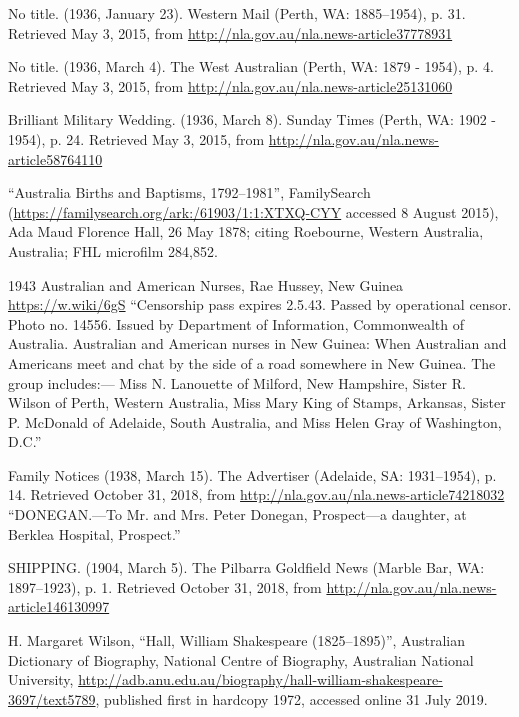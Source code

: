 \begin{thebibliography}{999}
	No title. (1936, January 23). Western Mail (Perth, WA: 1885--1954), p. 31. Retrieved May 3, 2015,
	from \url{http://nla.gov.au/nla.news-article37778931}

	No title. (1936, March 4). The West Australian (Perth, WA: 1879 - 1954), p. 4.
	Retrieved May 3, 2015, from \url{http://nla.gov.au/nla.news-article25131060}

	Brilliant Military Wedding. (1936, March 8). Sunday Times (Perth, WA: 1902 - 1954), p. 24.
	Retrieved May 3, 2015, from \url{http://nla.gov.au/nla.news-article58764110}

	``Australia Births and Baptisms, 1792--1981'', FamilySearch
	(\url{https://familysearch.org/ark:/61903/1:1:XTXQ-CYY} accessed 8 August 2015),
	Ada Maud Florence Hall, 26 May 1878; citing Roebourne, Western Australia, Australia;
	FHL microfilm 284,852.

    1943 Australian and American Nurses, Rae Hussey, New Guinea \url{https://w.wiki/6gS}
    ``Censorship pass expires 2.5.43. Passed by operational censor. Photo no. 14556.
    Issued by Department of Information, Commonwealth of Australia. Australian and American nurses in New Guinea:
    When Australian and Americans meet and chat by the side of a road somewhere in New Guinea. The group includes:---
    Miss N. Lanouette of Milford, New Hampshire, Sister R. Wilson of Perth, Western Australia,
    Miss Mary King of Stamps, Arkansas, Sister P. McDonald of Adelaide, South Australia,
    and Miss Helen Gray of Washington, D.C.''

    Family Notices (1938, March 15). The Advertiser (Adelaide, SA: 1931--1954), p. 14.
    Retrieved October 31, 2018, from \url{http://nla.gov.au/nla.news-article74218032}
    ``DONEGAN.---To Mr. and Mrs. Peter Donegan, Prospect---a daughter, at Berklea Hospital, Prospect.''

    SHIPPING. (1904, March 5). The Pilbarra Goldfield News (Marble Bar, WA: 1897--1923), p. 1.
    Retrieved October 31, 2018, from \url{http://nla.gov.au/nla.news-article146130997}

	H. Margaret Wilson, ``Hall, William Shakespeare (1825--1895)'',
	Australian Dictionary of Biography, National Centre of Biography, Australian National University,
	\url{http://adb.anu.edu.au/biography/hall-william-shakespeare-3697/text5789},
	published first in hardcopy 1972, accessed online 31 July 2019.


\end{thebibliography}
